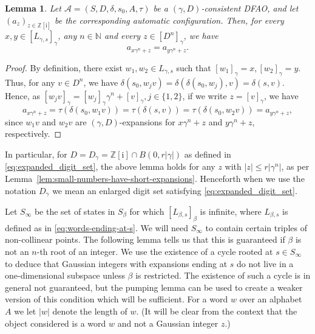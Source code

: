 \documentclass{amsart}
\newcommand{\N}{\mathbb{N}}
\newcommand{\Z}{\mathbb{Z}}
\newcommand{\ii}{\mathrm{i}}
\newtheorem*{main theorem}{Theorem \ref{thm:main-gaussian}}
\newtheorem{lemma}[theorem]{Lemma}
\theoremstyle{definition}
\begin{document}
 

\begin{lemma}\label{lem:shifting-expansions}
    Let $\mathcal{A}=(S,D,\delta,s_{0},A,\tau)$ be a $(\gamma , D)$-consistent DFAO, and let $(a_z)_{z\in\Z[\ii]}$ be the corresponding automatic configuration. Then, for every $x,y\in [L_{\gamma,s}]_\gamma$, any $n\in\N$ and every $z\in[D^n]_\gamma$, we have
        \begin{equation}\label{eq:shifting-expansions-formula}
            a_{x\gamma^n+z}=a_{y\gamma^n+z}.
        \end{equation}
   \end{lemma}

\begin{proof}
    By definition, there exist $w_1,w_2\in L_{\gamma,s}$ such that $[w_1]_\gamma=x,[w_2]_\gamma=y$. Thus, for any $v\in D^n$, we have $\delta(s_0,w_jv)=\delta(\delta(s_0,w_j),v)=\delta(s,v)$. Hence, as $[w_jv]_\gamma=[w_j]_\gamma\gamma^n+[v]_\gamma,j\in\{1,2\}$, if we write $z=[v]_\gamma$, we have
    \[a_{x\gamma^n+z}=\tau(\delta(s_0,w_1v))=\tau(\delta(s,v))=\tau(\delta(s_0,w_2v))=a_{y\gamma^n+z},\]
    since $w_1v$ and $w_2v$ are $(\gamma, D)$-expansions for $x\gamma^n+z$ and $y\gamma^n+z$, respectively.
\end{proof}

In particular, for $D=D_\gamma=\Z[\ii]\cap B(0,r\lvert\gamma\rvert)$ as defined in \eqref{eq:expanded_digit_set}, the above lemma holds for any $z$ with $\lvert z\rvert\le r\lvert \gamma^n\rvert$, as per Lemma~\ref{lem:small-numbers-have-short-expansions}. Henceforth when we use the notation $D_\gamma$ we mean an enlarged digit set satisfying
\eqref{eq:expanded_digit_set}.

 Let $S_\infty$ be the set of states in $S_\beta$ for which $[L_{\beta, s}]_\beta$ is infinite, where $L_{\beta, s}$ is defined as in \eqref{eq:words-ending-at-s}. We will need $S_\infty$ to contain certain  triples of non-collinear points. The following lemma tells us that this is guaranteed if $\beta$ is not 
 an $n$-th root of an integer.  
 We use the existence of a cycle rooted at $s \in S_\infty$ to deduce that Gaussian integers with expansions ending at $s$ do not live in a one-dimensional subspace unless $\beta$ is restricted. 
 The existence of such a cycle is in general not guaranteed, but the pumping lemma can be used to create a weaker version of this condition which will be sufficient.
 For a word $w$ over an alphabet $A$ we let $|w|$ denote the length of $w$.
  (It will be clear from the context that  the object considered is a word $w$ and not a Gaussian integer $z$.)
\end{document}
